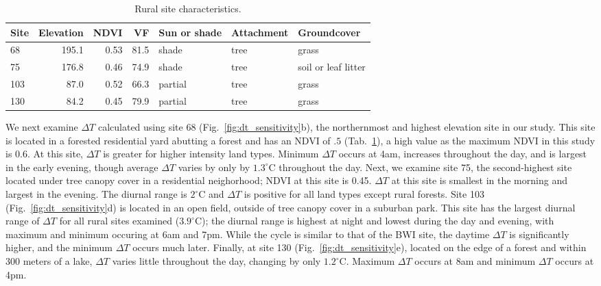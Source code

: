\begin{table}
\begin{tabular}{lrrrlll}
\toprule
Site &   Elevation &      NDVI &         VF &  Sun or shade & Attachment & Groundcover \\
\midrule
68  &  195.1 &  0.53&  81.5 &      shade &       tree &          grass  \\
75  &  176.8 &  0.46 &  74.9 &      shade &       tree &           soil or leaf litter\\
103 &   87.0 &  0.52 &  66.3 &    partial &       tree &          grass\\
130 &   84.2 &  0.45 &  79.9 &    partial &       tree &          grass \\
\bottomrule
\end{tabular}
\caption{Rural site characteristics.}
\label{tab:rural_ibuttons}
\end{table}

We next examine $\Delta T$ calculated using site 68 (Fig.~\ref{fig:dt_sensitivity}b), the northernmost and highest elevation site in our study. This site is located in a forested residential yard abutting a forest and has an NDVI of $.5$ (Tab.~\ref{tab:rural_ibuttons}), a high value as the maximum NDVI in this study is $0.6$. At this site, $\Delta T$ is greater for higher intensity land types. Minimum $\Delta T$ occurs at 4am, increases throughout the day, and is largest in the early evening, though average $\Delta T$ varies by only by $1.3^\circ$C throughout the day.
Next, we examine site 75, the second-highest site located under tree canopy cover in a residential neighorhood; NDVI at this site is 0.45. 
$\Delta T$ at this site is smallest in the morning and largest in the evening. The diurnal range is $2^\circ$C and $\Delta T$ is positive for all land types except rural forests. 
Site 103 (Fig.~\ref{fig:dt_sensitivity}d) is located in an open field, outside of tree canopy cover in a suburban park.  
This site has the largest diurnal range of $\Delta T$ for all rural sites examined ($3.9^\circ$C); the diurnal range is highest at night and lowest during the day and evening, with maximum and minimum occuring at 6am and 7pm.
While the cycle is similar to that of the BWI site, the daytime $\Delta T$ is significantly higher, and the minimum $\Delta T$ occurs much later. 
Finally, at site 130  (Fig.~\ref{fig:dt_sensitivity}e), located on the edge of a forest and within 300 meters of a lake, $\Delta T$ varies little throughout the day, changing by only $1.2^\circ$C. Maximum $\Delta T$ occurs at 8am and minimum $\Delta T$ occurs at 4pm. 

